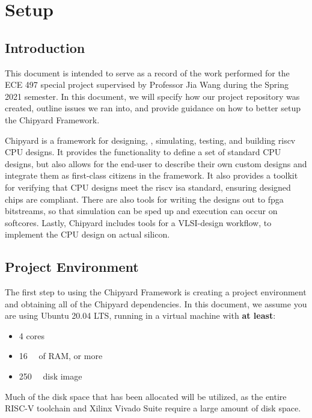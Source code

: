 \chapter{Setup}\label{chap:Setup}
\section{Introduction}\label{sec:Introduction}
This document is intended to serve as a record of the work performed for the ECE 497 special project supervised by Professor Jia Wang during the Spring 2021 semester.
In this document, we will specify how our project repository was created, outline issues we ran into, and provide guidance on how to better setup the Chipyard Framework.

Chipyard is a framework for designing, , simulating, testing, and building \Gls{riscv} CPU designs.
It provides the functionality to define a set of standard CPU designs, but also allows for the end-user to describe their own custom designs and integrate them as first-class citizens in the framework.
It also provides a toolkit for verifying that  CPU designs meet the \Gls{riscv} \Gls{isa} standard, ensuring designed chips are compliant.
There are also tools for writing the  designs out to \gls{fpga} bitstreams, so that simulation can be sped up and execution can occur on \glspl{softcore}.
Lastly, Chipyard includes tools for a VLSI-design workflow, to implement the  CPU design on actual silicon.

\section{Project Environment}\label{chap:Project_Environment}
The first step to using the Chipyard Framework is creating a project environment and obtaining all of the Chipyard dependencies.
In this document, we assume you are using Ubuntu 20.04 LTS, running in a virtual machine with \textbf{at least}:
\begin{itemize}
\item 4 cores
\item \SI{16}{\giga\byte} of RAM, or more
\item \SI{250}{\giga\byte} disk image
\end{itemize}

Much of the disk space that has been allocated will be utilized, as the entire RISC-V toolchain and Xilinx Vivado Suite require a large amount of disk space.

